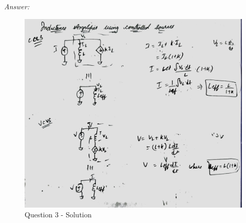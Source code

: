 \documentclass[a4paper]{article}
\begin{document}
\textit{Answer: }\\

\begin{figure}
    \centering
    \includegraphics[width=1\linewidth]{images/Lec_1_Q3_Soln.jpeg}
    \caption{Question 3 - Solution}
\end{figure}
\end{document}
